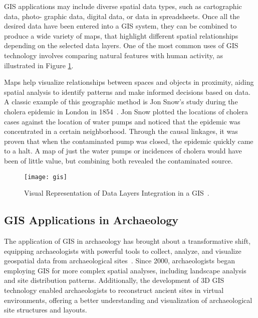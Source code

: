 \gls{GIS} applications may include diverse spatial data types, such as cartographic data, photo-
graphic data, digital data, or data in spreadsheets. Once all the desired data have been
entered into a \gls{GIS} system, they can be combined to produce a wide variety of maps,
that highlight different spatial relationships depending on the selected data layers. 
One of the most common uses of
\gls{GIS} technology involves comparing natural features with human activity, as illustrated in Figure \ref{fig:gis}.

Maps help visualize relationships between spaces and objects in proximity, aiding spatial analysis to identify patterns and make informed decisions based on data.
A classic example of this geographic method is Jon Snow's study during the cholera epidemic in London in 1854~\cite{inbook}. Jon Snow plotted the locations of cholera cases against the location of water pumps and noticed that the epidemic was concentrated in a certain neighborhood. 
Through the causal linkages, it was proven that when the contaminated pump was closed, the epidemic quickly came to a halt. 
A map of just the water pumps or incidences of cholera would have been of little value, but combining both revealed the contaminated source. 
\begin{figure}[h!]
    \centering
    \texttt{[image: gis]}
    \caption{Visual Representation of Data Layers Integration in a \gls{GIS}~\cite{gao_data_layers}.}
    \label{fig:gis}
\end{figure}
\FloatBarrier

\subsection{GIS Applications in Archaeology}
\label{sub:gis_archeology}

The application of \gls{GIS} in archaeology has brought about a transformative shift, equipping archaeologists with powerful tools to collect, analyze, 
and visualize geospatial data from archaeological sites~\cite{yao2023overview}. Since 2000, archaeologists began employing \gls{GIS} for more complex spatial analyses, including landscape analysis and site distribution 
patterns. Additionally, the development of \gls{3D} \gls{GIS} technology enabled archaeologists to reconstruct ancient sites in virtual environments, offering a 
better understanding and visualization of archaeological site structures and layouts.

